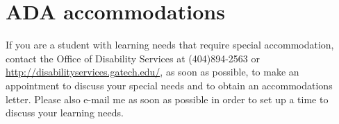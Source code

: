 \documentclass[
]{article}
\begin{document}
\hypertarget{ada-accommodations}{%
\section{ADA accommodations}\label{ada-accommodations}}

If you are a student with learning needs that require special
accommodation, contact the Office of Disability Services at
(404)894-2563 or \url{http://disabilityservices.gatech.edu/}, as soon as
possible, to make an appointment to discuss your special needs and to
obtain an accommodations letter. Please also e-mail me as soon as
possible in order to set up a time to discuss your learning needs.
\end{document}
